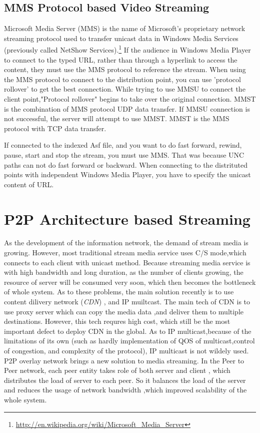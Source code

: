 \subsection{MMS Protocol based Video Streaming}
{

Microsoft Media Server (MMS) is the name of Microsoft's proprietary network streaming protocol used to transfer unicast data in Windows Media Services (previously called NetShow Services).\footnote{\url{http://en.wikipedia.org/wiki/Microsoft_Media_Server}}
If the audience in Windows Media Player to connect to the typed URL, rather than through a hyperlink to access the content, they must use the MMS protocol to reference the stream. When using the MMS protocol to connect to the distribution point, you can use 'protocol rollover' to get the best connection. While trying to use MMSU to connect the client point,"Protocol rollover" begins to take over the original connection. MMST is the combination of MMS protocol UDP data transfer. If MMSU connection is not successful, the server will attempt to use MMST. 
MMST is the MMS protocol with TCP data transfer.

If connected to the indexed Asf file, and you want to do fast forward, rewind, pause, start and stop the stream, you must use MMS. That was because UNC paths can not do fast forward or backward.
When connecting to the distrituted points with independent Windows Media Player, you have to specify the unicast content of URL. 
}


\section{P2P Architecture based Streaming}
{
  As the development of the information network, the demand of stream media is growing.  However, most traditional stream media service uses C/S mode,which connects to each client with unicast method. Because streaming media service is with high bandwidth and long duration, as the number of clients growing, the resource of server will be consumed very soon, which then becomes the bottleneck of whole system. As to these problems, the main solution recently is to use content dilivery network (\emph{CDN}) , and IP muiltcast. The main tech of CDN is to use proxy server which can copy the media data ,and deliver them to multiple destinations. However, this tech requres high cost, which still be the most important defect to deploy CDN in the global. As to IP multicast,because of the limitations of its own (such as hardly implementation of QOS of multicast,control of congestion, and complexity of the protocol), IP multicast is not wildely used. P2P overlay network  brings a new solution to media streaming. In the Peer to Peer network, each peer entity takes role of both server and client , which distributes the load of server to each peer. So it balances the load of the server and reduces the usage of network bandwidth ,which improved scalability of the whole system.
}

